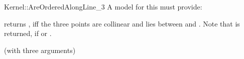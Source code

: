 \begin{ccRefFunctionObjectConcept}{Kernel::AreOrderedAlongLine_3}
A model for this must provide:


         {returns , iff the three points are collinear and 
           lies between  and .
          Note that  is returned, if  or
          .}

\ccRefines
{} (with three arguments)

\ccSeeAlso
{}  \\


\end{ccRefFunctionObjectConcept}
